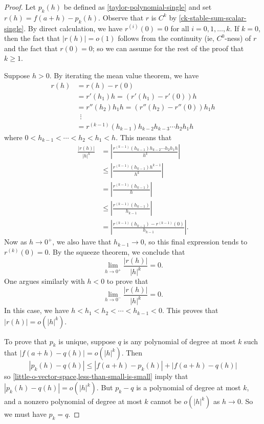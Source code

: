 \begin{proof}
	Let $p_k(h)$ be defined as \cref{taylor-polynomial-single} and set $r(h) = f(a+h) - p_k(h)$. Observe that $r$ is $C^k$ by \cref{ck-stable-sum-scalar-single}. By direct calculation, we have $r^{(i)}(0) = 0$ for all $i = 0, 1, \dotsc, k$. If $k = 0$, then the fact that $|r(h)| = o(1)$ follows from the continuity (ie, $C^0$-ness) of $r$ and the fact that $r(0) = 0$; so we can assume for the rest of the proof that $k \geq 1$. 
	
	Suppose $h > 0$. By iterating the mean value theorem, we have
	\[ \begin{aligned} r(h) &= r(h) - r(0) \\
	&= r'(h_1)h = (r'(h_1) - r'(0))h \\
	&= r''(h_2)h_1 h = (r''(h_2) - r''(0))h_1 h \\
	&\enspace\vdots\\
	&= r^{(k-1)}(h_{k-1}) h_{k-2} h_{k-3} \dotsb h_2 h_1 h \end{aligned} \]
	where $0 < h_{k-1} < \dotsb < h_2 < h_1 < h$. This means that
	\[ \begin{aligned} \frac{|r(h)|}{|h|^k} &= \left| \frac{r^{(k-1)}(h_{k-1}) h_{k-2} \dotsb h_2 h_1 h}{h^k} \right| \\
	&\leq \left| \frac{r^{(k-1)}(h_{k-1}) h^{k-1}}{h^k} \right| \\
	&= \left| \frac{r^{(k-1)}(h_{k-1})}{h} \right| \\
	&\leq \left| \frac{r^{(k-1)}(h_{k-1})}{h_{k-1}} \right| \\
	&= \left| \frac{r^{(k-1)}(h_{k-1}) - r^{(k-1)}(0)}{h_{k-1}} \right|. \end{aligned}  \]
	Now as $h \to 0^+$, we also have that $h_{k-1} \to 0$, so this final expression tends to $r^{(k)}(0) = 0$. By the squeeze theorem, we conclude that 
	\[ \lim_{h \to 0^+} \frac{|r(h)|}{|h|^k} = 0. \]
	One argues similarly with $h < 0$ to prove that
	\[ \lim_{h \to 0^-} \frac{|r(h)|}{|h|^k} = 0. \]
	In this case, we have $h < h_1 < h_2 < \dotsb < h_{k-1} < 0$. This proves that $|r(h)| = o(|h|^k)$.
	
	To prove that $p_k$ is unique, suppose $q$ is any polynomial of degree at most $k$ such that $|f(a+h) -q(h)| = o(|h|^k)$. Then 
	\[ |p_k(h) - q(h)| \leq |f(a+h) - p_k(h)| + |f(a+h) - q(h)| \] 
	so \cref{little-o-vector-space,less-than-small-is-small} imply that $|p_k(h) -  q(h)| = o(|h|^k)$. But $p_k - q$ is a polynomial of degree at most $k$, and a nonzero polynomial of degree at most $k$ cannot be $o(|h|^k)$ as $h \to 0$. So we must have $p_k = q$.
\end{proof}

